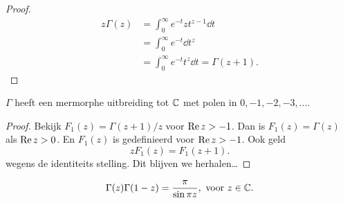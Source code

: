 \begin{proof}
\begin{align*}
	z \Gamma(z) &= \int_{0}^{\infty} e^{-t}z t ^{z - 1} \dd t \\
		    &= \int_{0}^{\infty} e^{-t} \dd t ^{z}  \\
		    &= \int_{0}^{\infty} e^{-t}t ^{z} \dd t = \Gamma (z + 1)  
.\end{align*}	
\end{proof}
\begin{stelling}
	$\Gamma$ heeft een mermorphe uitbreiding tot $\mathbb{C}$ met polen in $0, -1, -2, -3, \ldots$. 
\end{stelling}
\begin{proof}
	Bekijk $F_1(z) = \Gamma(z + 1) / z$ voor $\operatorname{Re} z > -1$.
	Dan is  $F_1(z) = \Gamma(z)$ als $\operatorname{Re} z > 0$. En $F_1(z) $ is gedefinieerd voor $\operatorname{Re} z > -1$. 
	Ook geld \[
		z F_1(z) = F_1(z + 1)
	.\] wegens de identiteits stelling. 
	Dit blijven we herhalen\ldots
\end{proof}
\begin{stelling}
	\[
		\Gamma(z) \Gamma(1 - z) = \frac{\pi}{\sin \pi z}, \text{ voor } z \in \mathbb{C}
	.\] 
\end{stelling}
